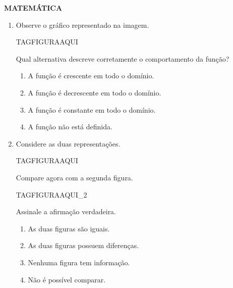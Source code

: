 \documentclass{article}
\begin{document}
\noindent \textbf{MATEMÁTICA}
\begin{enumerate}
\item Observe o gráfico representado na imagem.

TAGFIGURAAQUI

Qual alternativa descreve corretamente o comportamento da função?
\begin{enumerate}
\item A função é crescente em todo o domínio.
\item A função é decrescente em todo o domínio.
\item A função é constante em todo o domínio.
\item A função não está definida.
\end{enumerate}

\item Considere as duas representações.

TAGFIGURAAQUI

Compare agora com a segunda figura.

TAGFIGURAAQUI_2

Assinale a afirmação verdadeira.
\begin{enumerate}
\item As duas figuras são iguais.
\item As duas figuras possuem diferenças.
\item Nenhuma figura tem informação.
\item Não é possível comparar.
\end{enumerate}
\end{enumerate}

\end{document}
